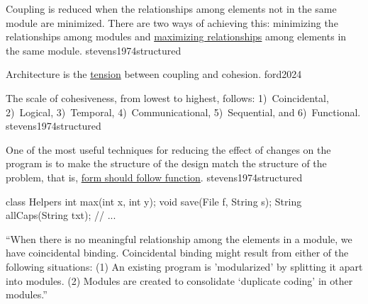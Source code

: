 \documentclass{article}
\begin{document}

  {Coupling is reduced when the relationships among elements not in the same module are minimized. There are two ways of achieving this: minimizing the relationships among modules and \ul{maximizing relationships} among elements in the same module.}
  {stevens1974structured}


  {Architecture is the \ul{tension} between coupling and cohesion.}
  {ford2024}

  {The scale of cohesiveness, from lowest to highest, follows:
    1)~Coincidental,
    2)~Logical,
    3)~Temporal,
    4)~Communicational,
    5)~Sequential,
    and
    6)~Functional.}
  {stevens1974structured}


  {One of the most useful techniques for reducing the effect of changes on the program is to make the structure of the design match the structure of the problem, that is, \ul{form should follow function}.}
  {stevens1974structured}

\begin{multicols}{2}
{\small\begin{ffcode}
class Helpers {
  int max(int x, int y);
  void save(File f, String s);
  String allCaps(String txt);
  // ...
}
\end{ffcode}
}
\par\columnbreak\par
``When there is no meaningful relationship among the elements in a module, we have coincidental binding. Coincidental binding
might result from either of the following situations: (1) An existing program is 'modularized' by splitting it apart into modules. (2) Modules are created to consolidate `duplicate coding' in other modules.''
\end{multicols}
\plush{}
\end{document}
